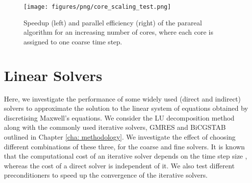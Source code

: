   \begin{figure}[h]
    \centering
    \texttt{[image: figures/png/core\_scaling\_test.png]}
    \caption{Speedup (left) and parallel efficiency (right) of the parareal algorithm for an increasing number of cores, where each core is assigned to one coarse time step.}
    \label{fig: core scaling}
\end{figure}


\section{Linear Solvers}
\label{sec: linear solvers}
Here, we investigate the performance of some widely used (direct and indirect) solvers to approximate the solution to the linear system of equations obtained by discretising Maxwell's equations. 
We consider the LU decomposition method along with the commonly used iterative solvers, GMRES and BiCGSTAB outlined in Chapter \ref{cha: methodology}. We investigate the effect of choosing different combinations of these three, for the coarse and fine solvers. It is known that the computational cost of an iterative solver depends on the time step size \cite{einkemmer_adaptive_2018, hochbruck_exponential_1998}, whereas the cost of a direct solver is independent of it. We also test different preconditioners to speed up the convergence of the iterative solvers.

